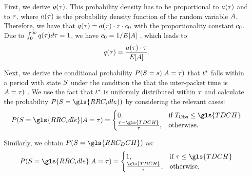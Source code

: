 First, we derive \(q(\tau)\). 
This probability density has to be proportional to \(a(\tau)\) and to \(\tau\), where \(a(\tau)\) is the probability density function of the random variable \(A\). 
Therefore, we have that 
\(q(\tau)=a(\tau)\cdot\tau\cdot c_0\)
with the proportionality constant \(c_0\).
Due to 
\(\int_0^\infty q(\tau)d\tau=1\),
we have 
\(c_0=1/E[A]\)
, which leads to
\begin{equation}
q(\tau)=\frac{a(\tau) \cdot \tau}{E[A]}.
\label{eq:network:performance_model:system_description:state_distribution:observation_density}
\end{equation}

Next, we derive the conditional probability
\(P(S=s) \vert A = \tau)\)
that \(t^*\) falls within a period with state \(S\) under the condition the that the inter-packet time is
\(A = \tau)\)
. We use the fact that \(t^*\) is uniformly distributed within \(\tau\) and calculate the probability 
\(P(\RRCState = \gls{RRC_idle})\)
by considering the relevant cases:
\begin{equation}
P(\RRCState=\gls{RRC_idle}\vert \PacketIAT = \ObservationIntervalLength)=
\begin{cases} 
	0,  & \mbox{if } \ObservationInterval \leq \gls{TDCH} \\ 
    \frac{\ObservationIntervalLength - \gls{TDCH}}{\ObservationIntervalLength}, & \mbox{otherwise.}	 
\end{cases}
\end{equation}

Similarly, we obtain \(P(\RRCState = \gls{RRC_DCH})\) as:
\begin{equation}
P(\RRCState=\gls{RRC_idle} \vert \PacketIAT = \ObservationIntervalLength)=
\begin{cases} 
	1,  & \mbox{if } \ObservationIntervalLength \leq \gls{TDCH} \\ 
    \frac{\gls{TDCH}}{\ObservationIntervalLength}, & \mbox{otherwise.}	 
\end{cases}
\label{eq:network:performance_model:system_description:state_distribution:conditional_probability_dch}
\end{equation} 


